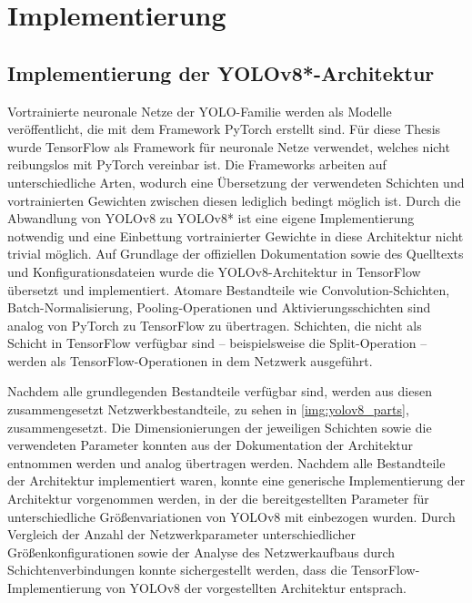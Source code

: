 
\section{Implementierung}
\label{sec:ki:implementierung}



\subsection{Implementierung der YOLOv8*-Architektur}
\label{sec:yolov8_implementierung}

Vortrainierte neuronale Netze der YOLO-Familie werden als Modelle veröffentlicht, die mit dem Framework PyTorch erstellt sind. Für diese Thesis wurde TensorFlow als Framework für neuronale Netze verwendet, welches nicht reibungslos mit PyTorch vereinbar ist. Die Frameworks arbeiten auf unterschiedliche Arten, wodurch eine Übersetzung der verwendeten Schichten und vortrainierten Gewichten zwischen diesen lediglich bedingt möglich ist. Durch die Abwandlung von YOLOv8 zu YOLOv8* ist eine eigene Implementierung notwendig und eine Einbettung vortrainierter Gewichte in diese Architektur nicht trivial möglich. Auf Grundlage der offiziellen Dokumentation sowie des Quelltexts und Konfigurationsdateien wurde die YOLOv8-Architektur in TensorFlow übersetzt und implementiert. Atomare Bestandteile wie Convolution-Schichten, Batch-Normalisierung, Pooling-Operationen und Aktivierungsschichten sind analog von PyTorch zu TensorFlow zu übertragen. Schichten, die nicht als Schicht in TensorFlow verfügbar sind -- beispielsweise die Split-Operation -- werden als TensorFlow-Operationen in dem Netzwerk ausgeführt.

Nachdem alle grundlegenden Bestandteile verfügbar sind, werden aus diesen zusammengesetzt Netzwerkbestandteile, zu sehen in \autoref{img:yolov8_parts}, zusammengesetzt. Die Dimensionierungen der jeweiligen Schichten sowie die verwendeten Parameter konnten aus der Dokumentation der Architektur entnommen werden und analog übertragen werden. Nachdem alle Bestandteile der Architektur implementiert waren, konnte eine generische Implementierung der Architektur vorgenommen werden, in der die bereitgestellten Parameter für unterschiedliche Größenvariationen von YOLOv8 mit einbezogen wurden. Durch Vergleich der Anzahl der Netzwerkparameter unterschiedlicher Größenkonfigurationen sowie der Analyse des Netzwerkaufbaus durch Schichtenverbindungen konnte sichergestellt werden, dass die TensorFlow-Implementierung von YOLOv8 der vorgestellten Architektur entsprach.

